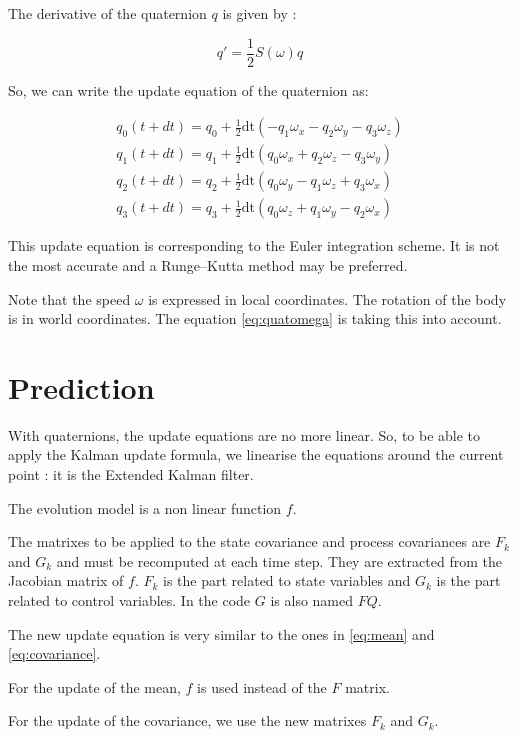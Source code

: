 \documentclass[titlepage,a4,12pt]{article}
\numberwithin{equation}{subsection}
\begin{document}
The derivative of the quaternion $q$ is given by :

\begin{equation}\label{eq:quatomega}
q' = \frac{1}{2} S(\omega) q
\end{equation}

So, we can write the update equation of the quaternion as:

\begin{align} \label{eq:update}
q_0(t+dt) = q_0 + \frac{1}{2} \text{dt} (-q_1 \omega_x-q_2 \omega_y-q_3 \omega_z)\\
q_1(t+dt) = q_1 + \frac{1}{2} \text{dt} (q_0 \omega_x+q_2 \omega_z-q_3 \omega_y)\\
q_2(t+dt) = q_2 + \frac{1}{2} \text{dt} (q_0 \omega_y-q_1 \omega_z+q_3 \omega_x)\\
q_3(t+dt) = q_3 + \frac{1}{2} \text{dt} (q_0 \omega_z+q_1 \omega_y-q_2 \omega_x)
\end{align}

This update equation is corresponding to the Euler integration scheme.
It is not the most accurate and a Runge–Kutta method may be preferred. 

Note that the speed $\omega$ is expressed in local coordinates. The rotation of the body is in world coordinates. The equation \ref{eq:quatomega} is taking this into account.


\section{Prediction}

With quaternions, the update equations are no more linear.
So, to be able to apply the Kalman update formula, we linearise the equations around the current point : it is the Extended Kalman filter.

The evolution model is a non linear function $f$.

The matrixes to be applied to the state covariance and process covariances are $F_k$ and $G_k$ and must be recomputed at each time step. They are extracted from the Jacobian matrix of $f$. $F_k$ is the part related to state variables and $G_k$ is the part related to control variables. In the code $G$ is also named $FQ$. 

The new update equation is very similar to the ones in \ref{eq:mean} and \ref{eq:covariance}.

For the update of the mean, $f$ is used instead of the $F$ matrix.

For the update of the covariance, we use the new matrixes $F_k$ and $G_k$.
\end{document}
